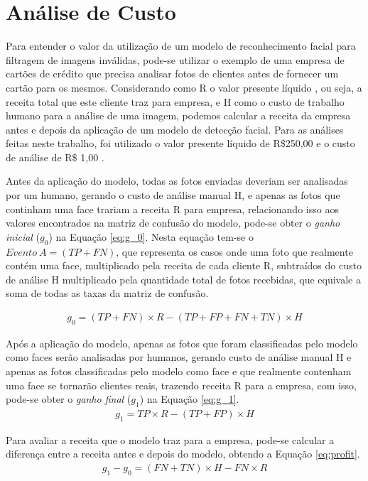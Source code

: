 \section{Análise de Custo}

Para entender o valor da utilização de um modelo de reconhecimento facial para filtragem de imagens inválidas, pode-se utilizar o exemplo de uma empresa de cartões de crédito que precisa analisar fotos de clientes antes de fornecer um cartão para os mesmos. Considerando como R o valor presente líquido \cite{npv-article}, ou seja, a receita total que este cliente traz para empresa, e H como o custo de trabalho humano para a análise de uma imagem, podemos calcular a receita da empresa antes e depois da aplicação de um modelo de detecção facial. Para as análises feitas neste trabalho, foi utilizado o valor presente líquido de R\$250,00 e o custo de análise de R\$ 1,00 \cite{hussain2007valuationnpv}.

Antes da aplicação do modelo, todas as fotos enviadas deveriam ser analisadas por um humano, gerando o custo de análise manual H, e apenas as fotos que continham uma face trariam a receita R para empresa, relacionando isso aos valores encontrados na matriz de confusão do modelo, pode-se obter o \textit{ganho inicial} ($g_0$) na Equação \eqref{eq:g_0}. Nesta equação tem-se o $Evento\:A = (TP + FN)$, que representa os casos onde uma foto que realmente contém uma face, multiplicado pela receita de cada cliente R, subtraídos do custo de análise H multiplicado pela quantidade total de fotos recebidas, que equivale a soma de todas as taxas da matriz de confusão.

\begin{align} \label{eq:g_0}
    g_0 = (TP+FN) \times R - (TP+FP+FN+TN) \times H
\end{align}

Após a aplicação do modelo, apenas as fotos que foram classificadas pelo modelo como faces serão analisadas por humanos, gerando custo de análise manual H e apenas as fotos classificadas pelo modelo como face e que realmente contenham uma face se tornarão clientes reais, trazendo receita R para a empresa, com isso, pode-se obter o \textit{ganho final} ($g_1$) na Equação \eqref{eq:g_1}.
\begin{align} \label{eq:g_1}
    g_1 = TP \times R - (TP+FP) \times H
\end{align}

Para avaliar a receita que o modelo traz para a empresa, pode-se calcular a diferença entre a receita antes e depois do modelo, obtendo a Equação \eqref{eq:profit}.
\begin{align} \label{eq:profit}
    g_1 - g_0 = (FN + TN) \times H - FN \times R
\end{align}

